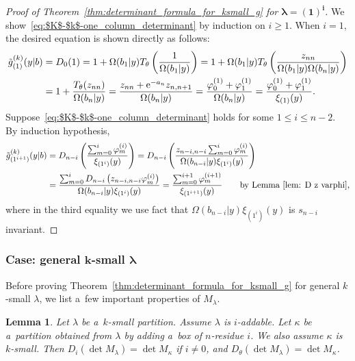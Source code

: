 \documentclass[10pt,a4paper]{amsart}
\numberwithin{equation}{section}
\newcommand{\co}{\xi}
\newcommand{\la}{\lambda}
\newtheorem{Lemma}[Theorem]{Lemma}
\theoremstyle{definition}
\begin{document}
\begin{proof}[Proof of Theorem~\ref{thm:determinant_formula_for_ksmall_g} for $\boldsymbol{\la=(1)^i}$]
We show~\eqref{eq:$K$-$k$-one_column_determinant} by induction on $i\geq 1$.
When $i=1$, the desired equation is shown directly as follows:
\begin{align*}
\tilde{g}^{(k)}_{(1)}(y|b)
&=D_0(1)=
1+\Omega(b_1|y) T_\theta\left(\frac{1}{\Omega(b_1|y)}\right)
=
1+\Omega(b_1|y) T_\theta\left(\frac{z_{nn}}{\Omega(b_1|y)\Omega(b_n|y)}\right)\\
&=1+\frac{T_\theta(z_{nn})}{\Omega(b_n|y)}
=\frac{z_{nn}+{\rm e}^{-a_n}z_{n,n+1}}{\Omega(b_n|y)}
=\frac{\varphi^{(1)}_0+\varphi^{(1)}_1}{\Omega(b_n|y)}
=\frac{\varphi^{(1)}_0+\varphi^{(1)}_1}{\co_{(1)}(y)}.
\end{align*}
Suppose~\eqref{eq:$K$-$k$-one_column_determinant} holds for some $1\le i\le n-2$.
By induction hypothesis,
\begin{align*}
\tilde{g}^{(k)}_{(1^{i+1})}(y|b)
&=D_{n-i}\left(
\frac{\sum_{m=0}^{i}\varphi^{(i)}_m}{\co_{(1^i)}(y)}
\right)=
D_{n-i}\left(
\frac{z_{n-i,n-i}\sum_{m=0}^{i}{{\varphi}}^{(i)}_m}{\Omega(b_{n-i}|y)\co_{(1^i)}(y)} \right)
\\
&=
\frac{
\sum_{m=0}^{i}D_{n-i}\left({z_{n-i,n-i}{\varphi}}^{(i)}_m\right) }{\Omega(b_{n-i}|y)\co_{(1^i)}(y)}=
\frac{
\sum_{m=0}^{i+1}\varphi^{(i+1)}_m }{\co_{(1^{i+1})}(y)}\qquad\text{by Lemma~\ref{lem: D z varphi}},
\end{align*}
where in the third equality we use
fact that $\Omega(b_{n-i}|y)\co_{(1^i)}(y)$ is $s_{n-i}$ invariant.
\end{proof}

\subsubsection[Case: general k-small la]{Case: general $\boldsymbol{k}$-small $\boldsymbol{\la}$}
Before proving Theorem~\ref{thm:determinant_formula_for_ksmall_g} for general $k$-small $\lambda$, we list a~few important properties of ${M}_\lambda$.




\begin{Lemma}\label{lem:comparing_determinants}
Let $\lambda$ be a~$k$-small partition.
Assume $\la$ is $i$-addable.
Let $\kappa$ be a~partition
obtained from $\lambda$ by adding a~box of $n$-residue $i$. We also assume $\kappa$ is $k$-small.
Then
$
 D_i(\det M_\lambda)=\det M_\kappa $ if $i\neq 0$, and $
D_\theta(\det M_\lambda)=\det M_\kappa$.
\end{Lemma}
\end{document}
